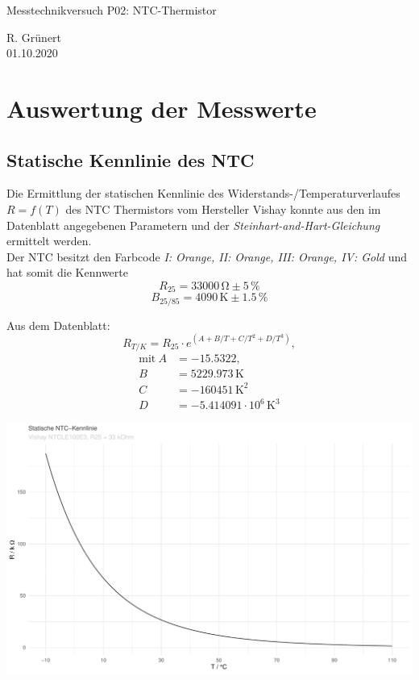 \documentclass{article}
\begin{document}
\begin{center}
\Large{Messtechnikversuch P02: NTC-Thermistor}
\end{center}

\begin{flushright}
  R. Grünert\\
  01.10.2020
\end{flushright}



\section{Auswertung der Messwerte}

\subsection{Statische Kennlinie des NTC}
Die Ermittlung der statischen Kennlinie des Widerstands-/Temperaturverlaufes $R=f(T)$ des NTC Thermistors vom Hersteller Vishay konnte aus den im Datenblatt angegebenen Parametern und der \textit{Steinhart-and-Hart-Gleichung} ermittelt werden.\\

Der NTC besitzt den Farbcode \textit{I: Orange, II: Orange, III: Orange, IV: Gold} und hat somit die Kennwerte
\[R_{25} = 33000 \, \si{\ohm} \pm 5 \, \si{\percent}\]
\[B_{25/85} = 4090 \, \si{\kelvin} \pm 1.5 \, \si{\percent}\]

Aus dem Datenblatt:
\[
  R_{T/K} = R_{25} \cdot e^{(A + B/T + C/T^{2} + D/T^{3})},
\]
\begin{align*}
  \text{mit}~A &= -15.5322, \\
  B &= 5229.973 \, \si{\kelvin}\\
  C &= -160451 \, \si{\kelvin}^{2}\\
  D &= -5.414091 \cdot 10^{6} \, \si{\kelvin}^{3}
\end{align*}

\includegraphics[width=\textwidth]{graphics/ntcStatischeKennlinie.pdf}
\end{document}
